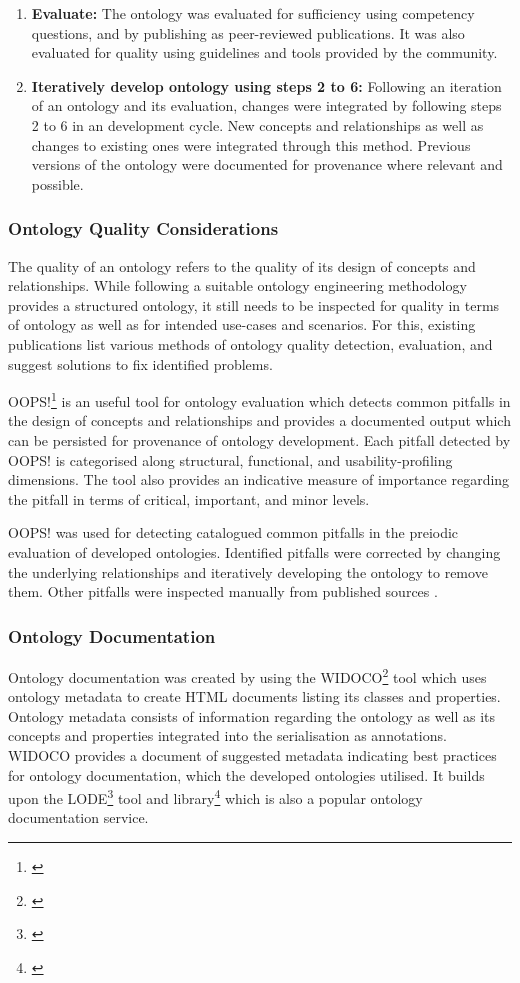 \begin{enumerate}
    \item \textbf{Evaluate:} The ontology was evaluated for sufficiency using competency questions, and by publishing as peer-reviewed publications. It was also evaluated for quality using guidelines and tools provided by the community.
    \item \textbf{Iteratively develop ontology using steps 2 to 6:} Following an iteration of an ontology and its evaluation, changes were integrated by following steps 2 to 6 in an development cycle. New concepts and relationships as well as changes to existing ones were integrated through this method. Previous versions of the ontology were documented for provenance where relevant and possible.
\end{enumerate}

\subsubsection*{Ontology Quality Considerations}
The quality of an ontology refers to the quality of its design of concepts and relationships. While following a suitable ontology engineering methodology provides a structured ontology, it still needs to be inspected for quality in terms of ontology as well as for intended use-cases and scenarios. For this, existing publications \cite{jeremy quality paper, vredicic thesis} list various methods of ontology quality detection, evaluation, and suggest solutions to fix identified problems.

OOPS!\footnote{\url{}} \cite{} is an useful tool for ontology evaluation which detects common pitfalls in the design of concepts and relationships and provides a documented output which can be persisted for provenance of ontology development. Each pitfall detected by OOPS! is categorised along  structural, functional, and usability-profiling dimensions. The tool also provides an indicative measure of importance regarding the pitfall in terms of critical, important, and minor levels.

OOPS! was used for detecting catalogued common pitfalls in the preiodic evaluation of developed ontologies. Identified pitfalls were corrected by changing the underlying relationships and iteratively developing the ontology to remove them. Other pitfalls were inspected manually from published sources \cite{}. 

\subsubsection*{Ontology Documentation}
Ontology documentation was created by using the WIDOCO\footnote{\url{}} \cite{} tool which uses ontology metadata to create HTML documents listing its classes and properties. Ontology metadata consists of information regarding the ontology as well as its concepts and properties integrated into the serialisation as annotations. WIDOCO provides a document of suggested metadata indicating best practices for ontology documentation, which the developed ontologies utilised. It builds upon the LODE\footnote{\url{}} tool and library\footnote{\url{}} which is also a popular ontology documentation service.

